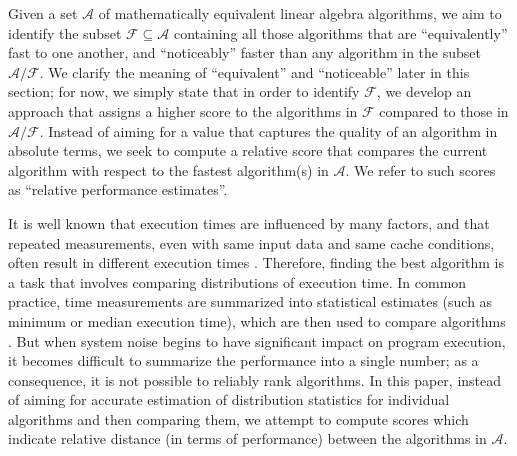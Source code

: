 \documentclass[conference]{IEEEtran}
\begin{document}
Given a set $\mathcal{A}$ of mathematically equivalent linear algebra algorithms, we aim to identify the subset
$\mathcal{F} \subseteq \mathcal{A}$ containing all those algorithms that are ``equivalently'' fast to one another, and
``noticeably'' faster than any algorithm in the subset $\mathcal{A}/\mathcal{F}$. We clarify the meaning of ``equivalent'' and
``noticeable'' later in this section; for now, we simply state that in order to identify $\mathcal{F}$, 
we develop an approach that assigns a higher score to the algorithms in
$\mathcal{F}$ compared to those in $\mathcal{A}/\mathcal{F}$. Instead of aiming for a value that captures the quality of an algorithm in absolute terms, we seek to compute a relative score that compares the current algorithm with respect to the fastest algorithm(s) in $\mathcal{A}$. We refer to such scores as ``relative performance estimates''.

It is well known that execution times are influenced by many factors, and that repeated measurements, even with same input data and same cache conditions, often result in different execution times\cite{peise2014cache} \cite{hoefler2010characterizing} \cite{peise2012performance}. Therefore, finding the best algorithm is a task that involves comparing distributions of execution time.
%
In common practice, time measurements are summarized into statistical estimates (such as minimum or median execution time), which are then used to compare algorithms\cite{peise2019elaps} \cite{hoefler2015scientific}. But when system noise begins to have significant impact on program execution, it becomes difficult to summarize the performance into a single number; as a consequence, it is not possible to reliably rank algorithms. In this paper, instead of aiming for accurate estimation of distribution statistics for individual algorithms and then comparing them, we attempt to compute scores which indicate relative distance (in terms of performance) between the algorithms in $\mathcal{A}$.
\end{document}

